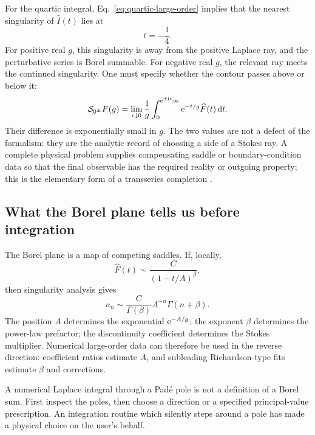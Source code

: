 For the quartic integral, Eq.~\eqref{eq:quartic-large-order} implies that the
nearest singularity of $\widehat I(t)$ lies at
\begin{equation}
  t=-\frac14.
  \label{eq:quartic-borel-singularity}
\end{equation}
For positive real $g$, this singularity is away from the positive Laplace
ray, and the perturbative series is Borel summable.  For negative real $g$,
the relevant ray meets the continued singularity.  One must specify whether
the contour passes above or below it:
\begin{equation}
  \mathcal S_{0^\pm}F(g)
  =\lim_{\epsilon\downarrow0}
  \frac{1}{g}\int_{0}^{\mathrm{e}^{\pm\mathrm{i}\epsilon}\infty}
  \mathrm{e}^{-t/g}\widehat F(t)\,\mathrm{d} t.
  \label{eq:lateral-borel-sums}
\end{equation}
Their difference is exponentially small in $g$.  The two values are not a
defect of the formalism: they are the analytic record of choosing a side of a
Stokes ray.  A complete physical problem supplies compensating saddle or
boundary-condition data so that the final observable has the required
reality or outgoing property; this is the elementary form of a transseries
completion \cite{Dorigoni:2014hea,Delabaere:1999xx}.

\subsection{What the Borel plane tells us before integration}
\label{subsec:borel-diagnostics}

The Borel plane is a map of competing saddles.  If, locally,
\begin{equation}
  \widehat F(t)\sim \frac{C}{(1-t/A)^\beta},
  \label{eq:borel-local-singularity}
\end{equation}
then singularity analysis gives
\begin{equation}
  a_n\sim
  \frac{C}{\Gamma(\beta)}A^{-n}\Gamma(n+\beta).
  \label{eq:borel-large-order-dictionary}
\end{equation}
The position $A$ determines the exponential $\mathrm{e}^{-A/g}$; the exponent
$\beta$ determines the power-law prefactor; the discontinuity coefficient
determines the Stokes multiplier.  Numerical large-order data can therefore
be used in the reverse direction: coefficient ratios estimate $A$, and
subleading Richardson-type fits estimate $\beta$ and corrections.

\begin{warningbox}
A numerical Laplace integral through a Pad\'e pole is not a definition of a
Borel sum.  First inspect the poles, then choose a direction or a specified
principal-value prescription.  An integration routine which silently steps
around a pole has made a physical choice on the user's behalf.
\end{warningbox}

